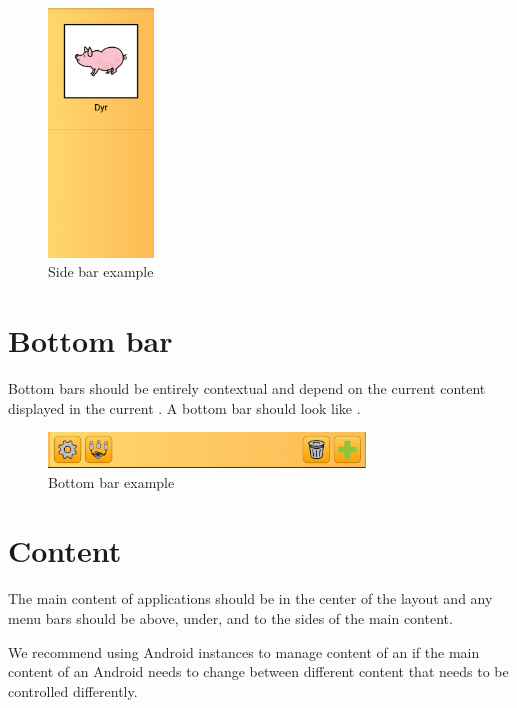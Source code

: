 \begin{figure}[!htbp]
        \centering
        \includegraphics[width=0.25\textwidth]{pictures/application_structure/sidebar}
        \caption{Side bar example}
        \label{fig:side_bar_example}
\end{figure}

\FloatBarrier


\section{Bottom bar}
Bottom bars should be entirely contextual and depend on the current content displayed in the current . A bottom bar should look like .

\begin{figure}[!htbp]
        \centering
        \includegraphics[width=0.75\textwidth]{pictures/application_structure/bottombar}
        \caption{Bottom bar example}
        \label{fig:bottom_bar_example}
\end{figure}

\FloatBarrier


\section{Content}
The main content of applications should be in the center of the layout and any menu bars should be above, under, and to the sides of the main content. 

\begin{note}
We recommend using Android  instances to manage content of an  if the main content of an Android  needs to change between different content that needs to be controlled differently. 
\end{note}


